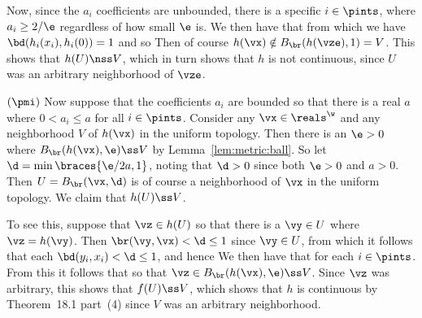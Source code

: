 {{    Now, since the $a_i$ coefficients are unbounded, there is a specific $i \in \pints$, where $a_i \geq 2/\e$ regardless of how small $\e$ is.
    We then have that
    from which we have $\bd(h_i(x_i), h_i(0)) = 1$ and so
    Then of course $h(\vx) \notin B_{\br}(h(\vze), 1) = V$.
    This shows that $h(U) \nss V$, which in turn shows that $h$ is not continuous, since $U$ was an arbitrary neighborhood of $\vze$.

    $(\pmi)$ Now suppose that the coefficients $a_i$ are bounded so that there is a real $a$ where $0 < a_i \leq a$ for all $i \in \pints$.
    Consider any $\vx \in \reals^\w$ and any neighborhood $V$ of $h(\vx)$ in the uniform topology.
    Then there is an $\e > 0$ where $B_{\br}(h(\vx), \e) \ss V$ by Lemma~\ref{lem:metric:ball}.
    So let $\d = \min\braces{\e/2a, 1}$, noting that $\d > 0$ since both $\e > 0$ and $a > 0$.
    Then $U = B_{\br}(\vx, \d)$ is of course a neighborhood of $\vx$ in the uniform topology.
    We claim that $h(U) \ss V$.

    To see this, suppose that $\vz \in h(U)$ so that there is a $\vy \in U$ where $\vz = h(\vy)$.
    Then $\br(\vy, \vx) < \d \leq 1$ since $\vy \in U$, from which it follows that each $\bd(y_i, x_i) < \d \leq 1$, and hence
    We then have that
    for each $i \in \pints$.
    From this it follows that
    so that $\vz \in B_{\br}(h(\vx), \e) \ss V$.
    Since $\vz$ was arbitrary, this shows that $f(U) \ss V$, which shows that $h$ is continuous by Theorem~18.1 part~(4) since $V$ was an arbitrary neighborhood.
  }

}
